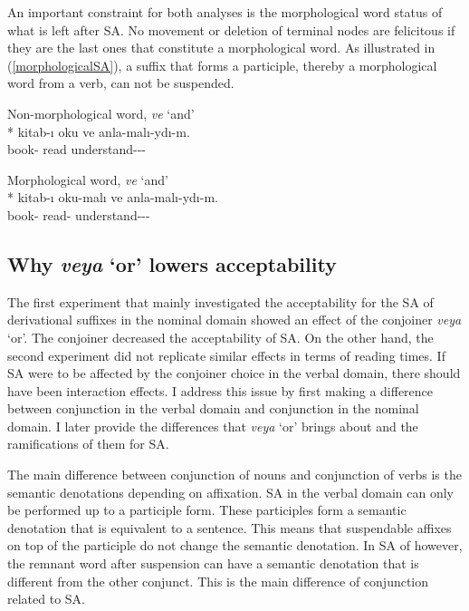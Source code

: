 An important constraint for both analyses is the morphological word status of what is left after SA. No movement or deletion of terminal nodes are felicitous if they are the last ones that constitute a morphological word. As illustrated in (\ref{morphologicalSA}), a suffix that forms a participle, thereby a morphological word from a verb, can not be suspended.

\begin{exe}
    \ex \label{morphologicalSA}
    \begin{xlist}
    \ex Non-morphological word, \textit{ve} `and'\\*
    \gll *kitab-ı oku ve anla-malı-ydı-m. \\ 
    book-{\Acc} read {\And} understand-{\Nec}-{\Pst}-{\Fsg} \\
    \glt ${}$
    
    \ex Morphological word, \textit{ve} `and'\\*
    \gll kitab-ı oku-malı ve anla-malı-ydı-m. \\
    book-{\Acc} read-{\Nec} {\And} understand-{\Nec}-{\Pst}-{\Fsg} \\
    \glt ${}$
    \end{xlist}
\end{exe}

\subsection{Why \textit{veya} `or' lowers acceptability}

The first experiment that mainly investigated the acceptability for the SA of derivational suffixes in the nominal domain showed an effect of the conjoiner \textit{veya} `or'. The conjoiner decreased the acceptability of {\Case} SA. On the other hand, the second experiment did not replicate similar effects in terms of reading times. If SA were to be affected by the conjoiner choice in the verbal domain, there should have been interaction effects. I address this issue by first making a difference between conjunction in the verbal domain and conjunction in the nominal domain. I later provide the differences that \textit{veya} `or' brings about and the ramifications of them for SA. 

The main difference between conjunction of nouns and conjunction of verbs is the semantic denotations depending on affixation. SA in the verbal domain can only be performed up to a participle form. These participles form a semantic denotation that is equivalent to a sentence. This means that suspendable affixes on top of the participle do not change the semantic denotation. In SA of {\Case} however, the remnant word after suspension can have a semantic denotation that is different from the other conjunct. This is the main difference of conjunction related to SA.

